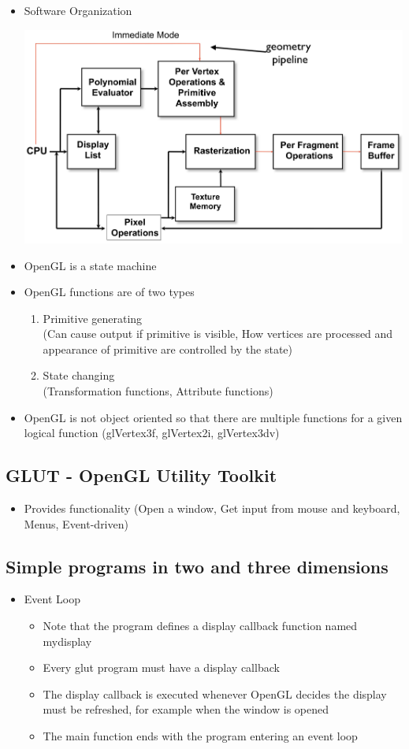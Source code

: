 \documentclass[11pt,a4paper]{article}
\begin{document}
\begin{itemize}
			\item Software Organization
			\begin{center}
				\includegraphics[scale=0.3]{pictures/pic3.jpg}
			\end{center}
			\item OpenGL is a state machine
			\item OpenGL functions are of two types
				\begin{enumerate}
					\item Primitive generating \\
						(Can cause output if primitive is visible, How vertices are processed and appearance of primitive are controlled by the state)
					\item State changing\\
						(Transformation functions, Attribute functions)
				\end{enumerate}
			\item OpenGL is not object oriented so that there are multiple functions for a given logical function (glVertex3f, glVertex2i, glVertex3dv)
		\end{itemize}
	\subsection{GLUT - OpenGL Utility Toolkit}
		\begin{itemize}
			\item  Provides functionality (Open a window, Get input from mouse and keyboard, Menus, Event-driven)
		\end{itemize}
	\subsection{Simple programs in two and three dimensions}
		\begin{itemize}
			\item  Event Loop
			\begin{itemize}
				\item Note that the program defines a display callback function named mydisplay
				\item Every glut program must have a display callback
				\item The display callback is executed whenever OpenGL decides the display must be refreshed, for example when the window is opened
				\item The main function ends with the program entering an event loop
			\end{itemize}
		\end{itemize}
\end{document}

